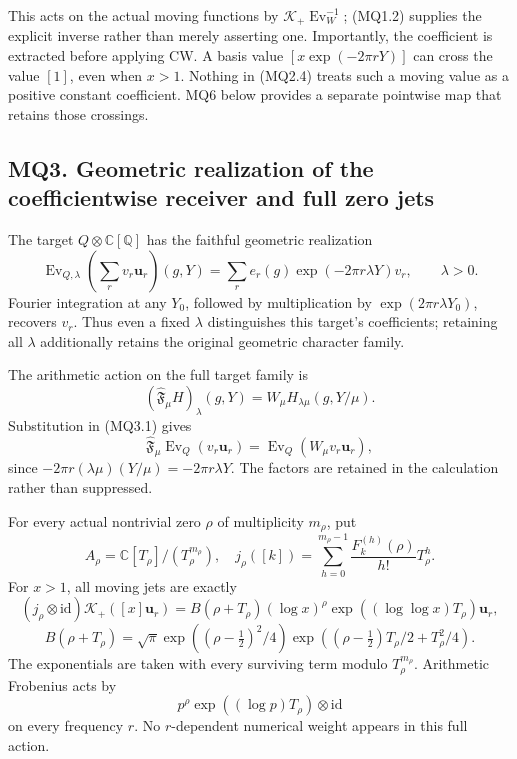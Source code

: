 This acts on the actual moving functions by
\(\mathcal K_+\operatorname{Ev}_W^{-1}\); (MQ1.2) supplies the explicit
inverse rather than merely asserting one. Importantly, the coefficient
is extracted before applying CW. A basis value \([x\exp(-2\pi rY)]\) can
cross the value \([1]\), even when \(x>1\). Nothing in (MQ2.4) treats
such a moving value as a positive constant coefficient. MQ6 below
provides a separate pointwise map that retains those crossings.

\subsection{MQ3. Geometric realization of the coefficientwise receiver
and full zero
jets}\label{mq3.-geometric-realization-of-the-coefficientwise-receiver-and-full-zero-jets}

The target \(Q\otimes\mathbb C[\mathbb Q]\) has the faithful geometric
realization \[
\operatorname{Ev}_{Q,\lambda}
\left(\sum_r v_r\mathbf u_r\right)(g,Y)
=\sum_r e_r(g)\exp(-2\pi r\lambda Y)v_r,
\qquad\lambda>0.
\tag{MQ3.1}
\] Fourier integration at any \(Y_0\), followed by multiplication by
\(\exp(2\pi r\lambda Y_0)\), recovers \(v_r\). Thus even a fixed
\(\lambda\) distinguishes this target's coefficients; retaining all
\(\lambda\) additionally retains the original geometric character
family.

The arithmetic action on the full target family is \[
(\widehat{\mathfrak F}_\mu H)_\lambda(g,Y)
=W_\mu H_{\lambda\mu}(g,Y/\mu).
\tag{MQ3.2}
\] Substitution in (MQ3.1) gives \[
\widehat{\mathfrak F}_\mu\operatorname{Ev}_Q(v_r\mathbf u_r)
=\operatorname{Ev}_Q(W_\mu v_r\mathbf u_r),
\] since \(-2\pi r(\lambda\mu)(Y/\mu)=-2\pi r\lambda Y\). The factors
are retained in the calculation rather than suppressed.

For every actual nontrivial zero \(\rho\) of multiplicity \(m_\rho\),
put \[
A_\rho=\mathbb C[T_\rho]/(T_\rho^{m_\rho}),\quad
j_\rho([k])=\sum_{h=0}^{m_\rho-1}
\frac{F_k^{(h)}(\rho)}{h!}T_\rho^h.
\] For \(x>1\), all moving jets are exactly \[
(j_\rho\otimes\mathrm{id})\mathcal K_+([x]\mathbf u_r)
=B(\rho+T_\rho)(\log x)^\rho
\exp((\log\log x)T_\rho)\mathbf u_r,
\] \[
B(\rho+T_\rho)=
\sqrt\pi\exp((\rho-\tfrac12)^2/4)
\exp((\rho-\tfrac12)T_\rho/2+T_\rho^2/4).
\tag{MQ3.3}
\] The exponentials are taken with every surviving term modulo
\(T_\rho^{m_\rho}\). Arithmetic Frobenius acts by \[
p^\rho\exp((\log p)T_\rho)\otimes\mathrm{id}
\tag{MQ3.4}
\] on every frequency \(r\). No \(r\)-dependent numerical weight appears
in this full action.


